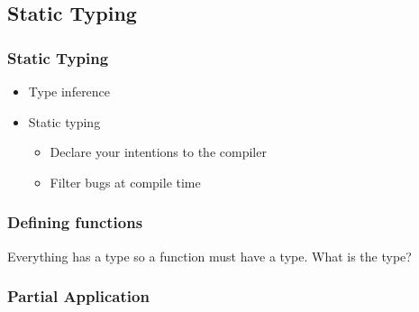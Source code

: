 \documentclass{beamer}
\begin{document}
\subsection{Static Typing}

\begin{frame}[fragile]
  \frametitle{Static Typing}
  \begin{itemize}
  \item Type inference
  \item Static typing
    \begin{itemize}
    \item Declare your intentions to the compiler
    \item Filter bugs at compile time
    \end{itemize}
  \end{itemize}
\end{frame}

\begin{frame}[fragile]
  \frametitle{Defining functions}
  Everything has a type so a function must have a type.
  What is the type?
\end{frame}

\begin{frame}[fragile]
  \frametitle{Partial Application}
\end{frame}
\end{document}
